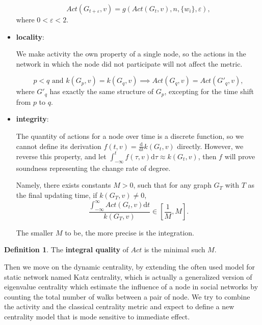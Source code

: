 \documentclass[12pt,abstract=true]{scrartcl}
\numberwithin{equation}{section}
\theoremstyle{definition}   \newtheorem{definition}{Definition}[section]
\theoremstyle{plain}        \newtheorem{theorem}{Theorem}[section]
\theoremstyle{plain}        \newtheorem{observation}{Observation}[section]
\theoremstyle{plain}        \newtheorem{fact}{Fact}[section]
\theoremstyle{plain}        \newtheorem{claim}{Claim}[section]
\theoremstyle{plain}        \newtheorem{lemma}[theorem]{Lemma}
\theoremstyle{plain}        \newtheorem{corollary}[theorem]{Corollary}
\theoremstyle{remark}       \newtheorem{example}{Example}[section]
\theoremstyle{remark}       \newtheorem{remark}{Remark}[section]
\begin{document}
\begin{itemize}
\begin{equation}
\mathit{Act}(G_{t+\varepsilon},v)=g(\mathit{Act}(G_t,v),n,\{w_i\},\varepsilon),
\label{eq-sym}
\end{equation}
where $0<\varepsilon<2$.

\item \textbf{locality}:

We make activity the own property of a single node, so the actions in the
network in which the node did not participate will not affect the metric.

\begin{equation}
p<q\text{ and }k(G_p,v)=k(G_q,v)\implies \mathit{Act}(G_q,v)=\mathit{Act}(G'_q,v),\label{eq-loc}
\end{equation}
where $G'_q$ has exactly the same structure of $G_p$, excepting for the time
shift from $p$ to $q$.

\item \textbf{integrity}:

The quantity of actions for a node over time is a discrete function, so we
cannot define its derivation $f(t,v)=\frac{\mathrm{d}}{\mathrm{d}t}k(G_t,v)$
directly. However, we reverse this property, and let $\int_{-\infty}^t
f(\tau,v)\mathrm{d}\tau\approx k(G_t,v)$, then $f$ will prove soundness
representing the change rate of degree.

Namely, there exists constants $M>0$, such that for any
graph $G_T$ with $T$ as the final updating time, if $k(G_T,v)\neq 0$,
\begin{equation}
\frac{\int_{-\infty}^{\infty} \mathit{Act}(G_t,v)\mathrm{d}t}{k(G_T,v)}\in\left[\frac{1}{M},M\right].
\label{eq-int}
\end{equation}

The smaller $M$ to be, the more precise is the integration.

\end{itemize}

\begin{definition}
The \textbf{integral quality} of $\mathit{Act}$ is the minimal such $M$.
\end{definition}


Then we move on the dynamic centrality, by extending the often used model
for static network named Katz centrality\cite{katz1953new}, which is actually
a generalized version of eigenvalue centrality which estimate the influence
of a node in social networks by counting the total number of walks between a pair of
node. We try to combine the activity and the classical centrality metric and
expect to define a new centrality model that is mode sensitive to immediate
effect.
\end{document}
